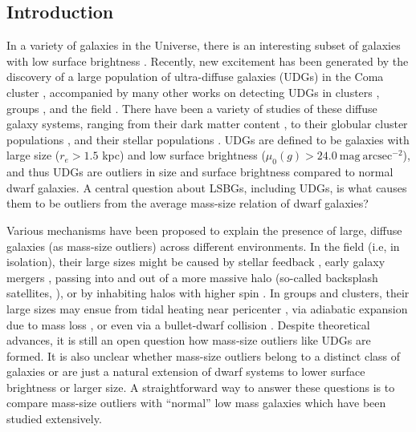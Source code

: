\documentclass[twocolumn,astrosymb,twocolappendix]{aastex631}
\newcommand{\sbunit}{\mathrm{mag\ arcsec}^{-2}}
\newcommand{\sbcen}{\mu_{0}(g)}
\begin{document}
\begin{CJK*}{UTF8}{gbsn}
\section{Introduction} \label{sec:intro}
In a variety of galaxies in the Universe, there is an interesting subset of galaxies with low surface brightness \citep[dubbed low surface brightness galaxies or LSBGs, e.g.,][]{Sandage1984,Caldwell1987,Impey1988,McGaugh1995,Dalcanton1997a}. Recently, new excitement has been generated by the discovery of a large population of ultra-diffuse galaxies (UDGs) in the Coma cluster \citep{vanDokkum2015}, accompanied by many other works on detecting UDGs in clusters \citep[e.g.,][]{Koda2015,Mihos2015,Yagi2016,vdBurg2016,vdBurg2017,Lee2017,ManceraPina2018,Zaritsky2019}, groups \citep[e.g.,][]{Roman2017b,Greco2018,SAGA-II,CarlstenELVES2022}, and the field \citep[e.g.,][]{Leisman2017,Roman2019,Prole2019,Tanoglidis2021,Kadowaki2021}. There have been a variety of studies of these diffuse galaxy systems, ranging from their dark matter content \citep[e.g.,][]{Mowla2017,vanDokkum2018,vanDokkum2019,Wasserman2019,Keim2022}, to their globular cluster populations \citep[e.g.,][]{vanDokkum2017,Somalwar2020,Forbes2020,Danieli2022,Gannon2022,vanDokkum2022GC}, and their stellar populations \citep[e.g.,][]{Gu2018,Ferre-Mateu2018,Villaume2022}. UDGs are defined to be galaxies with large size ($r_e > 1.5$ kpc) and low surface brightness ($\sbcen > 24.0\ \sbunit$), and thus UDGs are outliers in size and surface brightness compared to normal dwarf galaxies. A central question about LSBGs, including UDGs, is what causes them to be outliers from the average mass-size relation of dwarf galaxies?

Various mechanisms have been proposed to explain the presence of large, diffuse galaxies (as mass-size outliers) across different environments. In the field (i.e, in isolation), their large sizes might be caused by stellar feedback \citep{DiCintio2017,Chan2018}, early galaxy mergers \citep{Wright2021}, passing into and out of a more massive halo (so-called backsplash satellites, \citealt{Benavides2021}), or by inhabiting halos with higher spin \citep{Dalcanton1997,Amorisco2016,Liao2019,Benavides2022}. In groups and clusters, their large sizes may ensue from tidal heating near pericenter \citep{Jiang2019}, via adiabatic expansion due to mass loss \citep{Tremmel2020}, or even via a bullet-dwarf collision \citep{vandokkum2022Nat,vanDokkum2022GC}. Despite theoretical advances, it is still an open question how mass-size outliers like UDGs are formed. It is also unclear whether mass-size outliers belong to a distinct class of galaxies or are just a natural extension of dwarf systems to lower surface brightness or larger size. A straightforward way to answer these questions is to compare mass-size outliers with ``normal'' low mass galaxies which have been studied extensively. 


\end{CJK*}
\end{document}
